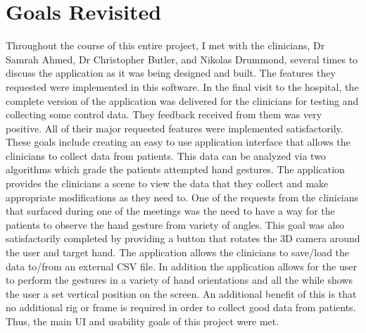 \section{Goals Revisited}
Throughout the course of this entire project, I met with the clinicians, Dr Samrah Ahmed, Dr Christopher Butler, and Nikolas Drummond, several times to discuss the application as it was being designed and built. The features they requested were implemented in this software. In the final visit to the hospital, the complete version of the application was delivered for the clinicians for testing and collecting some control data. They feedback received from them was very positive. All of their major requested features were implemented satisfactorily. These goals include creating an easy to use application interface that allows the clinicians to collect data from patients. This data can be analyzed via two algorithms which grade the patients attempted hand gestures. The application provides the clinicians a scene to view the data that they collect and make appropriate modifications as they need to. One of the requests from the clinicians that surfaced during one of the meetings was the need to have a way for the patients to observe the hand gesture from variety of angles. This goal was also satisfactorily completed by providing a button that rotates the 3D camera around the user and target hand. The application allows the clinicians to save/load the data to/from an external CSV file. In addition the application allows for the user to perform the gestures in a variety of hand orientations and all the while shows the user a set vertical position on the screen. An additional benefit of this is that no additional rig or frame is required in order to collect good data from patients. Thus, the main UI and usability goals of this project were met.




